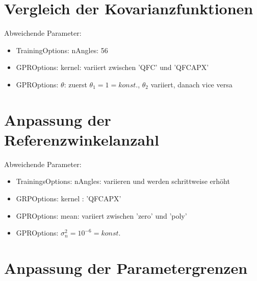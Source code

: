 \section{Vergleich der Kovarianzfunktionen}\label{sec:paramexp1}


Abweichende Parameter:

\begin{itemize}
	\item TrainingOptions: nAngles: 56
	\item GPROptions: kernel: variiert zwischen 'QFC' und 'QFCAPX'
	\item GPROptions: $\theta$: zuerst $\theta_1 = 1 = konst.$, $\theta_2$ variiert, danach vice versa 
\end{itemize}


\section{Anpassung der Referenzwinkelanzahl}\label{sec:paramexp2}


Abweichende Parameter:

\begin{itemize}
	\item TrainingsOptions: nAngles: variieren und werden schrittweise erhöht
	\item GRPOptions: kernel : 'QFCAPX'
	\item GPROptions: mean: variiert zwischen 'zero' und 'poly'
	\item GPROptions: $\sigma_n^2 = 10^{-6} = konst.$
\end{itemize}


\section{Anpassung der Parametergrenzen}\label{sec:paramexp4}



